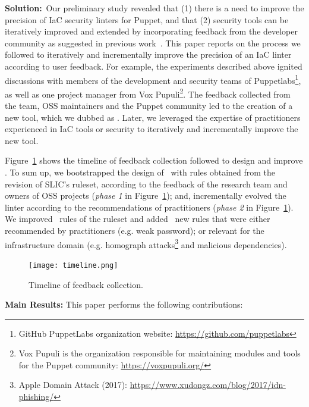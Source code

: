 \vspace{1ex}\noindent\textbf{Solution:}~Our preliminary study revealed
that (1) there is a need to improve the precision of IaC security linters for Puppet, 
and that (2) security tools can be iteratively improved and extended by incorporating 
feedback from the developer community as suggested in previous work~\cite{46576}. 
This paper reports on 
the process we followed to iteratively and 
incrementally improve the precision of an IaC linter according to user 
feedback. For example, the experiments described above ignited 
discussions with members of the development and security teams of 
Puppetlabs\footnote{GitHub PuppetLabs
organization website: \url{https://github.com/puppetlabs}}, as well as one
project manager from Vox Pupuli\footnote{Vox Pupuli is the organization responsible for maintaining
modules and tools for the Puppet community: \url{https://voxpupuli.org/}}.
The feedback collected from the team, OSS maintainers and the Puppet 
community led to the creation of a new tool, which we dubbed as \toolname{}.
Later, we leveraged the expertise of practitioners experienced 
in IaC tools or security to iteratively and incrementally
improve the new tool.

Figure~\ref{fig:timeline} shows the timeline of feedback collection 
followed to design and improve \toolname{}.
To sum up, we bootstrapped the design of \toolname\ with rules obtained 
from the revision of SLIC's ruleset, according to the feedback of the 
research team and owners of OSS projects (\textit{phase 1} in
Figure~\ref{fig:timeline}); and, incrementally evolved the linter
according to the recommendations of practitioners
(\textit{phase 2} in Figure~\ref{fig:timeline}). We improved
\noRulesSlic\ rules of the \slic{} ruleset and added
\newRules\ new rules that were either recommended by practitioners (e.g. weak
password); or relevant for the infrastructure domain (e.g. homograph
attacks\footnote{Apple Domain Attack (2017):
\url{https://www.xudongz.com/blog/2017/idn-phishing/}} and malicious dependencies).

\begin{figure}[t!]
  \centering
  \texttt{[image: timeline.png]}
  \caption{Timeline of feedback collection.}\label{fig:timeline}
  \vspace{-3ex}
\end{figure}

\vspace{1ex}\noindent\textbf{Main Results:}
This paper performs the following contributions:

